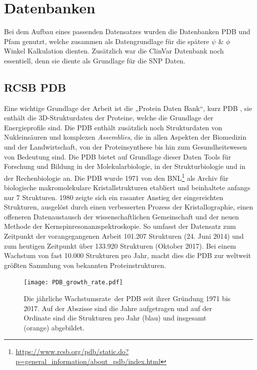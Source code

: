 \newpage
\section{Datenbanken}
Bei dem Aufbau eines passenden Datensatzes wurden die Datenbanken \ac{PDB} und \ac{Pfam} genutzt, welche zusammen als Datengrundlage für die spätere $\psi$ \& $\phi$ Winkel Kalkulation dienten. Zusätzlich war die ClinVar Datenbank noch essentiell, denn sie diente als Grundlage für die \ac{SNP} Daten.


\subsection{RCSB PDB}

Eine wichtige Grundlage der Arbeit ist die „Protein Daten Bank“, kurz PDB \cite{Bernstein.1977}, sie enthält die 3D-Strukturdaten der Proteine, welche die Grundlage der Energieprofile sind. Die \ac{PDB} enthält zusätzlich noch Strukturdaten von Nukleinsäuren und komplexen \emph{Assemblies}, die in allen Aspekten der Biomedizin und der Landwirtschaft, von der Proteinsynthese bis hin zum Gesundheitswesen von Bedeutung sind. Die \ac{PDB} bietet auf Grundlage dieser Daten Tools für Forschung und Bildung in der Molekularbiologie, in der Strukturbiologie und in der Rechenbiologie an.
Die \ac{PDB} wurde 1971 von den \ac{BNL}\footnote{\url{https://www.rcsb.org/pdb/static.do?p=general_information/about_pdb/index.html}} als Archiv für biologische makromolekulare Kristallstrukturen etabliert und beinhaltete anfangs nur 7 Strukturen. 1980 zeigte sich ein rasanter Anstieg der eingereichten Strukturen, ausgelöst durch einen verbesserten Prozess der Kristallographie, einen offeneren Datenaustausch der wissenschaftlichen Gemeinschaft und der neuen Methode der Kernspinresonanzspektroskopie. So umfasst der Datensatz zum Zeitpunkt der vorangegangenen Arbeit 101.207 Strukturen (24. Juni 2014) und zum heutigen Zeitpunkt über 133.920 Strukturen (Oktober 2017). Bei einem Wachstum von fast 10.000 Strukturen pro Jahr, macht dies die \ac{PDB} zur weltweit größten Sammlung von bekannten Proteinstrukturen.

\begin{figure}
\texttt{[image: PDB\_growth\_rate.pdf]}
\caption{Die jährliche Wachstumsrate\protect\footnotemark \ der \ac{PDB} seit ihrer Gründung 1971 bis 2017. Auf der Abszisse sind die Jahre aufgetragen und auf der Ordinate sind die Strukturen pro Jahr (blau) und insgesamt (orange) abgebildet.}
\label{fig:PDB_growth_rate}
\end{figure}

